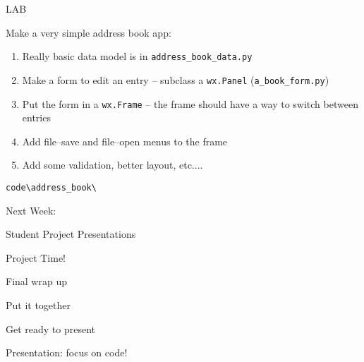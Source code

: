 \documentclass{beamer}
\begin{document}
\begin{frame}[fragile]{LAB}

\vfill
{\Large Make a very simple address book app:}

\begin{enumerate}
 \item Really basic data model is in \verb`address_book_data.py`
 \item Make a form to edit an entry -- subclass a \verb`wx.Panel` (\verb`a_book_form.py`)
 \item Put the form in a \verb`wx.Frame` -- the frame should have a way to switch between entries
 \item Add file--save and file--open menus to the frame
 \item Add some validation, better layout, etc....
\end{enumerate}

\vfill
\verb`code\address_book\`

\end{frame}





\begin{frame}{Next Week:}

\vfill
{\LARGE Student Project Presentations}

\vfill

\end{frame}

\begin{frame}[fragile]{Project Time!}

\vfill
\Large{Final wrap up}

\vfill
\Large{Put it together}

\vfill
\Large{Get ready to present}

\vfill
\Large{Presentation: focus on code!}

\end{frame}
\end{document}
